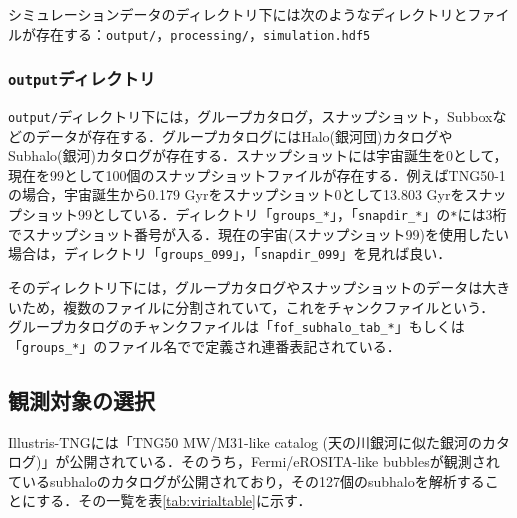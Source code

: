 シミュレーションデータのディレクトリ下には次のようなディレクトリとファイルが存在する：\texttt{output/}，\texttt{processing/}，\texttt{simulation.hdf5}

\subsubsection{\texttt{output}ディレクトリ}

\texttt{output/}ディレクトリ下には，グループカタログ，スナップショット，Subboxなどのデータが存在する．グループカタログにはHalo(銀河団)カタログやSubhalo(銀河)カタログが存在する．スナップショットには宇宙誕生を0として，現在を99として100個のスナップショットファイルが存在する．例えばTNG50-1の場合，宇宙誕生から0.179 Gyrをスナップショット0として13.803 Gyrをスナップショット99としている．ディレクトリ「\texttt{groups\_*}」，「\texttt{snapdir\_*}」の\texttt{*}には3桁でスナップショット番号が入る．現在の宇宙(スナップショット99)を使用したい場合は，ディレクトリ「\texttt{groups\_099}」，「\texttt{snapdir\_099}」を見れば良い．

そのディレクトリ下には，グループカタログやスナップショットのデータは大きいため，複数のファイルに分割されていて，これをチャンクファイルという． グループカタログのチャンクファイルは「\texttt{fof\_subhalo\_tab\_*}」もしくは「\texttt{groups\_*}」のファイル名でで定義され連番表記されている．

\subsection{観測対象の選択}

Illustris-TNGには「TNG50 MW/M31-like catalog (天の川銀河に似た銀河のカタログ)」が公開されている\citep{pillepich_milky_2023}．そのうち，Fermi/eROSITA-like bubblesが観測されているsubhaloのカタログが公開されており\citep{pillepich_x-ray_2021}，その127個のsubhaloを解析することにする．その一覧を表\ref{tab:virialtable}に示す．


